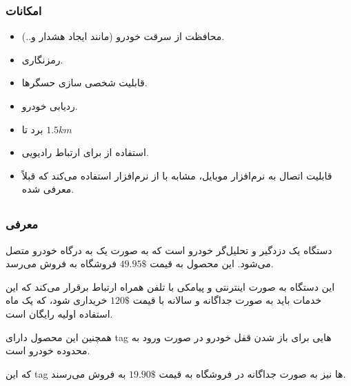 \documentclass[a4paper,12pt]{report}
\begin{document}
	\subsubsection{
		امکانات
	}\label{subsubsec3:subsec2:sec3:chap1}
	\begin{itemize}[nosep]\label{item1:subsec2:sec3:chap1}
		\item
		محافظت از سرقت خودرو (مانند ایجاد هشدار و..).
		\item
		رمزنگاری.
		\item
		قابلیت شخصی سازی حسگر‌ها.
		\item
		ردیابی خودرو.
		\item
		برد
		تا
		$1.5 km$
		\item
		استفاده از
		برای ارتباط رادیویی.
		\item
		قابلیت اتصال به نرم‌افزار موبایل، مشابه با
		از نرم‌افزار
		استفاده می‌کند که قبلاً معرفی شده.
	\end{itemize}

	\subsection{
	}\label{subsec3:sec3:chap1}
	\subsubsection{
		معرفی
	}\label{subsubsec1:subsec3:sec3:chap1}
	دستگاه
	یک دزدگیر و تحلیل‌گر خودرو است که به صورت یک
	به درگاه
	خودرو متصل می‌شود.
	این محصول به قیمت
	$49.95\$$
	فروشگاه
	\hyperref{https://www.amazon.com/gp/product/B00U0K3Q10/ref=as_li_tl?ie=UTF8&tag=eastcoastje03-20&camp=1789&creative=9325&linkCode=as2&creativeASIN=B00U0K3Q10&linkId=0d3d80c6869fc7dfbc5d6ccec21c2e97}{car alarm}{carlock}{}
	به فروش می‌رسد.

	این دستگاه به صورت اینترنتی و پیامکی با تلفن ‌همراه ارتباط برقرار می‌کند که این خدمات باید به صورت جداگانه و سالانه با قیمت
	$120\$$
	خریداری شود، که یک ماه استفاده اولیه رایگان است.

	همچنین این محصول دارای
	tag
	هایی برای باز شدن قفل خودرو در صورت ورود به محدوده خودرو است.

	که این
	tag
	ها نیز به صورت جداگانه در فروشگاه
	\hyperref{https://www.amazon.com/CARLOCK-TAG-Accessory-ONLY-Automatically/dp/B075F4SWZ7}{car alarm}{carlocktag}{}
	به قیمت
	$19.90\$$
	به فروش می‌رسند.
	\cite{carAlarm:online}
\end{document}
